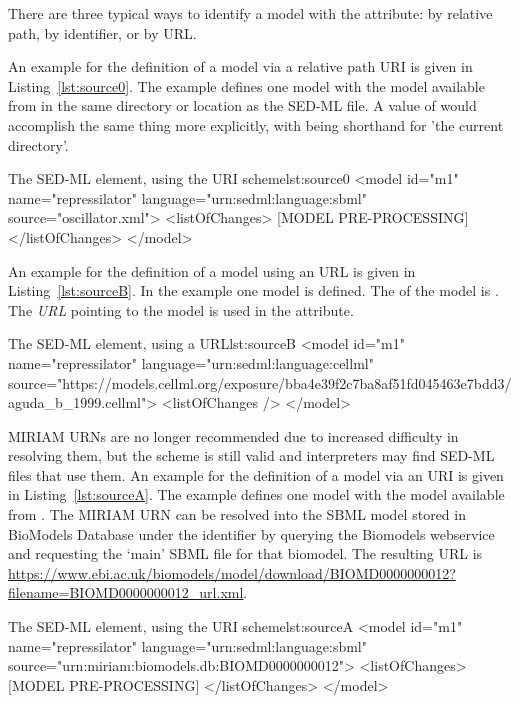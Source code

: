 There are three typical ways to identify a model with the  attribute:  by relative path, by identifier, or by URL.

An example for the definition of a model via a relative path URI is given in Listing~\ref{lst:source0}. The example defines one model  with the model  available from  in the same directory or location as the SED-ML file.  A  value of  would accomplish the same thing more explicitly, with  being shorthand for 'the current directory'.

\begin{myXmlLst}{The SED-ML  element, using the URI scheme}{lst:source0}
<model id="m1" name="repressilator" language="urn:sedml:language:sbml" 
	source="oscillator.xml">
	<listOfChanges>
		[MODEL PRE-PROCESSING]
	</listOfChanges>
</model>
\end{myXmlLst}


An example for the definition of a model using an URL is given in Listing~\ref{lst:sourceB}. In the example one model is defined. The  of the model is . The \emph{URL} pointing to the model is used in the  attribute.

\begin{myXmlLst}{The SED-ML  element, using a URL}{lst:sourceB}
<model id="m1" name="repressilator" language="urn:sedml:language:cellml" 
	source="https://models.cellml.org/exposure/bba4e39f2c7ba8af51fd045463e7bdd3/aguda_b_1999.cellml">
	<listOfChanges />
</model>
\end{myXmlLst}

MIRIAM URNs are no longer recommended due to increased difficulty in resolving them, but the scheme is still valid and interpreters may find SED-ML files that use them.  An example for the definition of a model via an URI is given in Listing~\ref{lst:sourceA}. The example defines one model  with the model  available from . The MIRIAM URN can be resolved into the SBML model stored in BioModels Database under the identifier  by querying the Biomodels webservice and requesting the `main' SBML file for that biomodel. The resulting URL is \url{https://www.ebi.ac.uk/biomodels/model/download/BIOMD0000000012?filename=BIOMD0000000012_url.xml}.

\begin{myXmlLst}{The SED-ML  element, using the URI scheme}{lst:sourceA}
<model id="m1" name="repressilator" language="urn:sedml:language:sbml" 
	source="urn:miriam:biomodels.db:BIOMD0000000012">
	<listOfChanges>
		[MODEL PRE-PROCESSING]
	</listOfChanges>
</model>
\end{myXmlLst}



